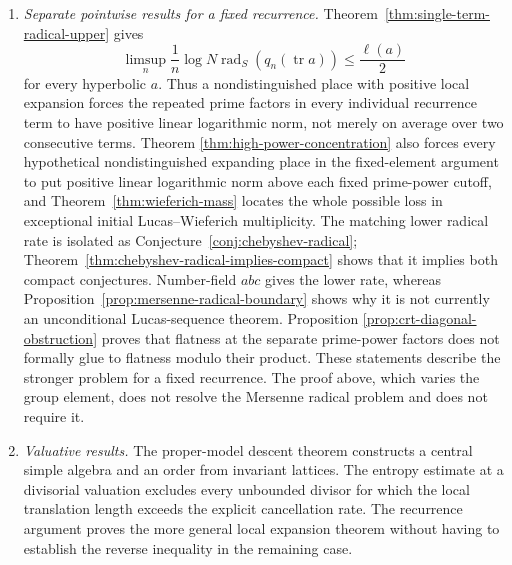 \documentclass[11pt,reqno]{amsart}
\theoremstyle{definition}
\theoremstyle{remark}
\newcommand{\Tr}{\operatorname{tr}}
\begin{document}
\begin{enumerate}[label=\textbf{\arabic*.},leftmargin=*]
\item \emph{Separate pointwise results for a fixed recurrence.}
Theorem~\ref{thm:single-term-radical-upper} gives
\[
 \limsup_n\frac1n
 \log N\operatorname{rad}_S(q_n(\Tr a))\le\frac{\ell(a)}2
\]
for every hyperbolic \(a\).  Thus a nondistinguished place with positive
local expansion forces the repeated prime factors in every individual
recurrence term to have positive linear logarithmic norm, not merely on
average over two consecutive terms.  Theorem
\ref{thm:high-power-concentration} also forces every hypothetical
nondistinguished expanding place in the fixed-element argument to put positive linear
logarithmic norm above each fixed prime-power cutoff, and
Theorem~\ref{thm:wieferich-mass} locates
the whole possible loss in exceptional initial Lucas--Wieferich
multiplicity.  The matching lower radical rate is isolated as
Conjecture~\ref{conj:chebyshev-radical};
Theorem~\ref{thm:chebyshev-radical-implies-compact} shows that it implies
both compact conjectures.  Number-field \(abc\) gives the lower rate,
whereas Proposition~\ref{prop:mersenne-radical-boundary} shows why it is
not currently an unconditional Lucas-sequence theorem.  Proposition
\ref{prop:crt-diagonal-obstruction} proves that flatness at the separate
prime-power factors does not formally glue to flatness modulo their product.
These statements describe the stronger problem for a fixed recurrence.  The
proof above, which varies the group element, does not resolve the Mersenne
radical problem and does not require it.

\item \emph{Valuative results.}
The proper-model descent theorem constructs a central simple algebra and an
order from invariant lattices.  The entropy estimate at a divisorial
valuation excludes every unbounded divisor for which the local translation
length exceeds the explicit cancellation rate.  The
recurrence argument proves the more general local expansion theorem without
having to establish the reverse inequality in the remaining case.
\end{enumerate}
\end{document}
